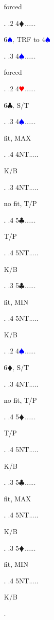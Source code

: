 \documentclass[a4paper]{article}
\newcommand{\BC}{\textcolor{OliveGreen}{$\clubsuit$}}
\newcommand{\BD}{\textcolor{RedOrange}{$\vardiamondsuit$}}
\newcommand{\BH}{\textcolor{Red}{$\varheartsuit${}}}
\newcommand{\BS}{\textcolor{Blue}{$\spadesuit${}}}
\begin{document}
{\begin{minipage}[t]{0.8\textwidth}
forced
\end{minipage}. 
 .2 4\BD......\begin{minipage}[t]{0.8\textwidth}
6\BS , TRF to 4\BS 
\end{minipage}. 
 .3 4\BS......\begin{minipage}[t]{0.8\textwidth}
forced
\end{minipage}. 
 .2 4\BH......\begin{minipage}[t]{0.8\textwidth}
6\BC , S/T
\end{minipage}. 
 .3 4\BS......\begin{minipage}[t]{0.8\textwidth}
fit, MAX
\end{minipage}. 
 .4 4NT.....\begin{minipage}[t]{0.8\textwidth}
K/B
\end{minipage}. 
 .3 4NT.....\begin{minipage}[t]{0.8\textwidth}
no fit, T/P
\end{minipage}. 
 .4 5\BC......\begin{minipage}[t]{0.8\textwidth}
T/P
\end{minipage}. 
 .4 5NT.....\begin{minipage}[t]{0.8\textwidth}
K/B
\end{minipage}. 
 .3 5\BC......\begin{minipage}[t]{0.8\textwidth}
fit, MIN
\end{minipage}. 
 .4 5NT.....\begin{minipage}[t]{0.8\textwidth}
K/B
\end{minipage}. 
 .2 4\BS......\begin{minipage}[t]{0.8\textwidth}
6\BD , S/T
\end{minipage}. 
 .3 4NT.....\begin{minipage}[t]{0.8\textwidth}
no fit, T/P
\end{minipage}. 
 .4 5\BD......\begin{minipage}[t]{0.8\textwidth}
T/P
\end{minipage}. 
 .4 5NT.....\begin{minipage}[t]{0.8\textwidth}
K/B
\end{minipage}. 
 .3 5\BC......\begin{minipage}[t]{0.8\textwidth}
fit, MAX
\end{minipage}. 
 .4 5NT.....\begin{minipage}[t]{0.8\textwidth}
K/B
\end{minipage}. 
 .3 5\BD......\begin{minipage}[t]{0.8\textwidth}
fit, MIN
\end{minipage}. 
 .4 5NT.....\begin{minipage}[t]{0.8\textwidth}
K/B
\end{minipage}. 
}
\bigbreak
\end{document}
